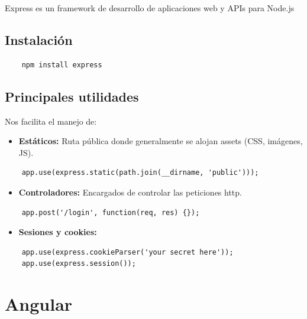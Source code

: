 \documentclass[openright,twoside,10pt]{book}
\providecommand{\tightlist}{%
  \setlength{\itemsep}{0pt}\setlength{\parskip}{0pt}}
\begin{document}
    Express es un framework de desarrollo de aplicaciones web y APIs para
    Node.js
    
    \subsection{Instalación}\label{instalaciuxf3n-2}
    
    \begin{verbatim}
    npm install express
    \end{verbatim}
    
    \subsection{Principales utilidades}\label{principales-utilidades}
    
    Nos facilita el manejo de:
    
    \begin{itemize}
    \tightlist
    \item
      \textbf{Estáticos:} Ruta pública donde generalmente se alojan assets
      (CSS, imágenes, JS).
    \end{itemize}
    
    \begin{verbatim}
    app.use(express.static(path.join(__dirname, 'public')));
    \end{verbatim}
    
    \begin{itemize}
    \tightlist
    \item
      \textbf{Controladores:} Encargados de controlar las peticiones http.
    \end{itemize}
    
    \begin{verbatim}
    app.post('/login', function(req, res) {});
    \end{verbatim}
    
    \begin{itemize}
    \tightlist
    \item
      \textbf{Sesiones y cookies:}
    \end{itemize}
    
    \begin{verbatim}
    app.use(express.cookieParser('your secret here'));
    app.use(express.session());
    \end{verbatim}
    
    \section{\texorpdfstring{Angular
    \cite{angular_docs}}{Angular }}\label{angular}
    
\end{document}
